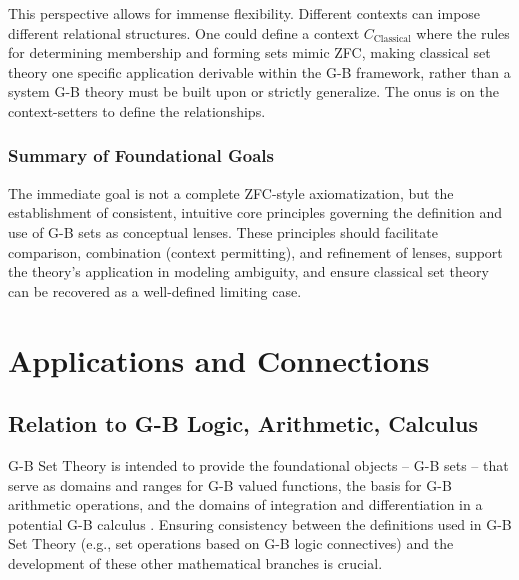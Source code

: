 \documentclass[11pt]{article}
\theoremstyle{definition}
\theoremstyle{plain}
\begin{document}
This perspective allows for immense flexibility. Different contexts can impose different relational structures. One could define a context $C_{\text{Classical}}$ where the rules for determining membership and forming sets mimic ZFC, making classical set theory one specific application derivable within the G-B framework, rather than a system G-B theory must be built upon or strictly generalize. The onus is on the context-setters to define the relationships.

\subsubsection{Summary of Foundational Goals}
The immediate goal is not a complete ZFC-style axiomatization, but the establishment of consistent, intuitive core principles governing the definition and use of G-B sets as conceptual lenses. These principles should facilitate comparison, combination (context permitting), and refinement of lenses, support the theory's application in modeling ambiguity, and ensure classical set theory can be recovered as a well-defined limiting case.

\section{Applications and Connections} \label{sec:applications}

\subsection{Relation to G-B Logic, Arithmetic, Calculus}
G-B Set Theory is intended to provide the foundational objects – G-B sets – that serve as domains and ranges for G-B valued functions, the basis for G-B arithmetic operations, and the domains of integration and differentiation in a potential G-B calculus \cite{gb_set_theory_outline}. Ensuring consistency between the definitions used in G-B Set Theory (e.g., set operations based on G-B logic connectives) and the development of these other mathematical branches is crucial.
\end{document}
